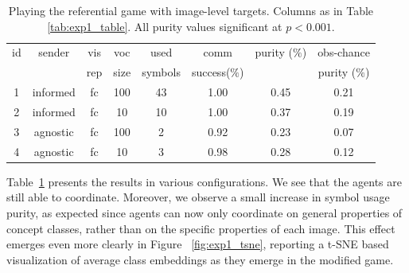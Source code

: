 
\begin{table}[tb]
\centering
\begin{tabular}{c|c|c|c|c|c|c|c}
id &sender   &vis   &voc &used     &comm    &      purity ($\%$)   &obs-chance\\
 &		& rep & size& symbols & success($\%$) &  & purity ($\%$) \\\hline
1&informed&fc      &100     &43          &1.00               &0.45         &0.21\\
2&informed&fc      &10      &10          &1.00               &0.37         &0.19\\
3&agnostic&fc      &100     &2           &0.92               &0.23         &0.07\\
4&agnostic&fc      &10      &3           &0.98               &0.28         &0.12\\
\end{tabular}
\caption{Playing the referential game with image-level targets. Columns as in Table \ref{tab:exp1_table}. All purity values significant at $p<0.001$.}
\label{tab:exp2_multiinstance}
\end{table}

Table~\ref{tab:exp2_multiinstance} presents the results in various
configurations. We see that the agents are still able to
coordinate. Moreover, we observe a small increase in symbol usage
purity, as expected since agents can now only coordinate on general
properties of concept classes, rather than on the specific properties
of each image. This effect emerges even more clearly in Figure
~\ref{fig:exp1_tsne}, reporting a t-SNE based visualization of
average class embeddings as they emerge in the modified game.

